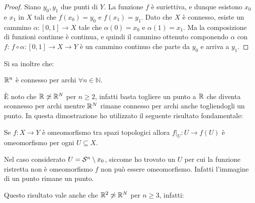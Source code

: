 \begin{proof}
  Siano $ y_0, y_1 $ due punti di $ Y $. La funzione $ f $ è suriettiva, e
  dunque esistono $ x_0 $ e $ x_1 $ in $ X $ tali che $ f(x_0)=y_0 $ e
  $ f(x_1)=y_1 $. Dato che $ X $ è connesso, esiste un cammino
  $ \alpha:[0,1] \to X $ tale che $ \alpha(0)=x_0 $ e $ \alpha(1)=x_1 $. Ma la composizione di
  funzioni continue è continua, e quindi il cammino ottenuto componendo
  $ \alpha $ con $ f $: $ f \circ \alpha : [0,1] \to X \to Y $ è un cammino continuo che parte da
  $ y_0 $ e arriva a $ y_1 $.
\end{proof}
\hfill \newline \noindent
Si sa inoltre che:
\begin{proposition}
  $ \mathbb{R}^{n} $ è connesso per archi $ \forall n \in \mathbb{N} $.
\end{proposition}

È noto che $ \mathbb{R}^{} \not \simeq \mathbb{R}^{N} $ per $ n \geq 2 $, infatti basta togliere un punto a $ \mathbb{R}^{} $ che diventa sconnesso per archi
mentre $ \mathbb{R}^{N} $ rimane connesso per archi anche togliendogli un punto. In questa dimostrazione ho utilizzato
il seguente risultato fondamentale:
\begin{proposition}
  Se $ f: X \to Y $ è omeomorfismo tra spazi topologici allora $ f \rvert_U : U \to f(U) $ è omeomorfismo per ogni $ U \subseteq X $.
\end{proposition}
Nel caso considerato $ U = \mathcal{S}^{n} \setminus {x_0} $, siccome ho trovato un
$ U $ per cui la funzione ristretta non è omeomorfismo $ f $ non può essere
omeomorfismo. Infatti l'immagine di un punto rimane un punto.

\noindent
Questo risultato vale anche che $ \mathbb{R}^{2} \not \simeq \mathbb{R}^{N} $ per $ n \geq 3 $, infatti:

